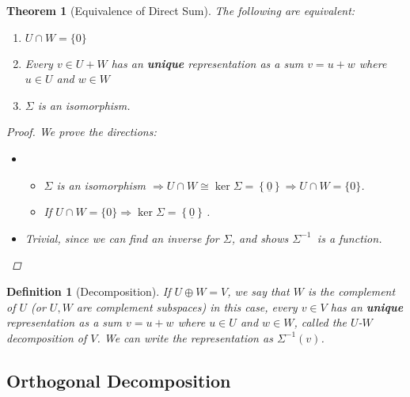 \documentclass[12pt]{article}
\let\RA\Rightarrow
\let\LA\Leftarrow
\let\LR\Leftrightarrow
\newcommand{\tuple}[1]{\underline{#1}}
\newtheorem{theorem}{Theorem}[subsection]
\newtheorem{definition}{Definition}[subsection]
\begin{document}
\begin{theorem}[Equivalence of Direct Sum]
  The following are equivalent:
  \begin{enumerate}
    \item $U\cap W=\{0\}\,$
    \item Every $v\in U+W$ has an \textbf{unique} representation as a sum $v=u+w$ where $u\in U$ and $w\in W$
    \item $\Sigma$ is an isomorphism.
  \end{enumerate}
  \begin{proof}
    We prove the directions:
    \begin{itemize}
      \item[$(1\LR 3)$] 
        \begin{itemize}
          \item [$(\LA)$] $\Sigma$ is an isomorphism $\RA U\cap W\cong \ker\Sigma=\left\{\tuple{0}\right\}\RA U\cap W=\{0\}$.
          \item [$(\RA)$] If $U\cap W=\{0\}\RA \ker\Sigma=\left\{\tuple{0}\right\}\,$.
        \end{itemize} 
      \item[$(2\LR 3)$] Trivial, since we can find an inverse for $\Sigma$, and shows $\Sigma^{-1}\,$ is a function.
    \end{itemize}
  \end{proof}
\end{theorem}

\begin{definition}[Decomposition]
  If $U\oplus W=V$, we say that $W$ is the complement of $U$ (or $U,W$ are complement subspaces) in this case, every $v\in V$ has an \textbf{unique} representation as a sum $v=u+w$ where $u\in U$ and $w\in W$, called the $U$-$W$ decomposition of $V$. We can write the representation as $\Sigma^{-1}(v)$.
\end{definition}

\subsection{Orthogonal Decomposition}
\end{document}
